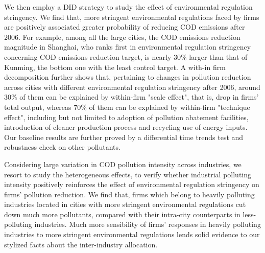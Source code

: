 \documentclass[12pt,english]{article}
\begin{document}
We then employ a DID strategy to study the effect of environmental regulation stringency. We find that, more stringent environmental regulations faced by firms are positively associated greater probability of reducing COD emissions after 2006. For example, among all the large cities, the COD emissions reduction magnitude in Shanghai, who ranks first in environmental regulation stringency concerning COD emissions reduction target, is nearly 30$\%$ larger than that of Kunming, the bottom one with the least control target. A with-in firm decomposition further shows that, pertaining to changes in pollution reduction across cities with different environmental regulation stringency after 2006, around 30$\%$ of them can be explained by within-firm "scale effect", that is, drop in firms' total output, whereas 70$\%$ of them can be explained by within-firm "technique effect", including but not limited to adoption of pollution abatement facilities, introduction of cleaner production process and recycling use of energy inputs. Our baseline results are further proved by a differential time trends test and robustness check on other pollutants.

Considering large variation in COD pollution intensity across industries, we resort to study the heterogeneous effects, to verify whether industrial polluting intensity positively reinforces the effect of environmental regulation stringency on firms' pollution reduction. We find that, firms which belong to heavily polluting industries located in cities with more stringent environmental regulations cut down much more pollutants, compared with their intra-city counterparts in less-polluting industries. Much more sensibility of firms’ responses in heavily polluting industries to more stringent environmental regulations lends solid evidence to our stylized facts about the inter-industry allocation.
\end{document}
